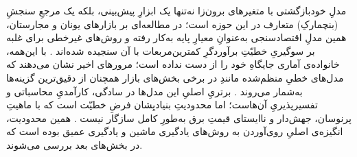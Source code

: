 مدلِ خودبازگشتی با متغیرهای برون‌زا نه‌تنها یک ابزارِ پیش‌بینی، بلکه یک مرجعِ
سنجشِ (بنچمارکِ) متعارف در این حوزه است؛ در مطالعه‌ای بر بازارهای یونان و
مجارستان، همین مدلِ اقتصادسنجی به‌عنوانِ معیارِ پایه به‌کار رفته و روش‌های غیرخطی
برای غلبه بر سوگیریِ خطیّتِ برآوردگرِ کمترین‌مربعات با آن سنجیده شده‌اند
\cite{haluzan_performance_2020}. با این‌همه، خانواده‌ی آماری جایگاهِ خود را از دست
نداده است؛ مرورهای اخیر نشان می‌دهند که مدل‌های خطیِ منظم‌شده مانندِ  در
برخی بخش‌های بازار همچنان از دقیق‌ترین گزینه‌ها به‌شمار می‌روند
\cite{oconnor_review_2025}. برتریِ اصلیِ این مدل‌ها در سادگی، کارآمدیِ محاسباتی و
تفسیرپذیریِ آن‌هاست؛ اما محدودیتِ بنیادیِشان فرضِ خطیّت است که با ماهیتِ پرنوسان،
جهش‌دار و ناایستای قیمتِ برق به‌طورِ کامل سازگار نیست \cite{jiang_review_2018}.
همین محدودیت، انگیزه‌ی اصلیِ روی‌آوردن به روش‌های یادگیری ماشین و یادگیری عمیق
بوده است که در بخش‌های بعد بررسی می‌شوند.
